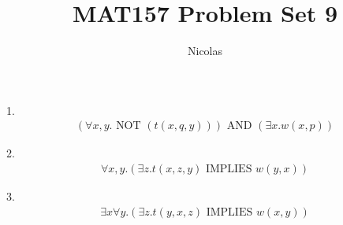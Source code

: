 \documentclass[11pt]{article}
\title{MAT157 Problem Set 9}
\author{Nicolas}
\newcommand{\andd}{\text{ AND }}
\newcommand{\nott}{\text{ NOT }}
\newcommand{\imp}{\text{ IMPLIES }}
\begin{document}
\maketitle
\begin{flushleft}

1. \begin{align*}
(\forall x,y . \nott (t(x,q,y))) \andd (\exists x. w(x,p))
\end{align*}

2. \begin{align*}
\forall x,y. (\exists z. t(x,z,y) \imp w(y,x))
\end{align*}

3. \begin{align*}
\exists x \forall y. (\exists z. t(y,x,z) \imp w(x,y))
\end{align*}

\end{flushleft}
\end{document}
